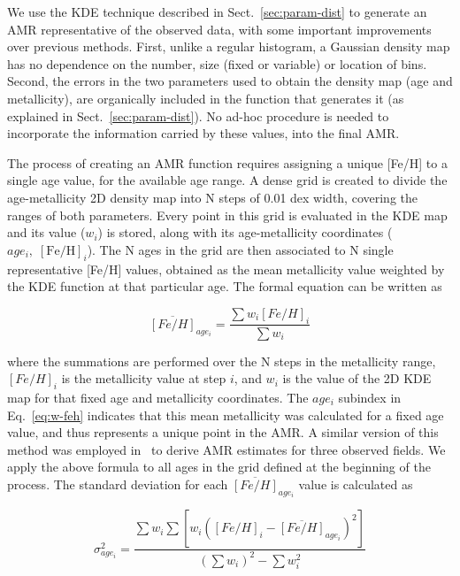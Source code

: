 \documentclass[referee]{aa}
\begin{document}
\begin{appendix}
We use the KDE technique described in Sect.~\ref{sec:param-dist} to
generate an AMR representative of the observed data, with some important
improvements over previous methods.
%
First, unlike a regular histogram, a Gaussian density map has no dependence on
the number, size (fixed or variable) or location of bins.
Second, the errors in the two parameters used to obtain the density map (age and
metallicity), are organically included in the function that generates it
(as explained in Sect.~\ref{sec:param-dist}). No ad-hoc procedure is needed to
incorporate the information carried by these values, into the final AMR.\@

The process of creating an AMR function
requires assigning a unique [Fe/H] to a single age value, for the available age
range.
%
A dense grid is created to divide the age-metallicity 2D density map into N
steps of 0.01 dex width, covering the ranges of both parameters. Every point in
this grid is evaluated in the KDE map and its value ($w_{i}$) is stored, along
with its age-metallicity coordinates ($age_{i},\;[\mathrm{Fe/H}]_{i}$).
%
The N ages in the grid are then associated to N single representative [Fe/H]
values, obtained as the mean metallicity value weighted by the KDE function at
that particular age. The formal equation can be written as

\begin{equation}
\overline{[Fe/H]}_{age_i}=\frac{\sum w_i {[Fe/H]}_i}{\sum w_i}
\label{eq:w-feh}
\end{equation}

\noindent where the summations are performed over the N steps in the metallicity
range, ${[Fe/H]}_i$ is the metallicity value at step $i$, and $w_i$ is the value
of the 2D KDE map for that fixed age and metallicity coordinates.
The $age_i$ subindex in Eq.~\ref{eq:w-feh} indicates that this mean
metallicity was calculated for a fixed age value, and thus represents a unique
point in the AMR.\@
A similar version of this method was employed  in~\citet[][see Eq. 3]{Noel_2009}
to derive AMR estimates for three observed fields.
We apply the above formula to all ages in the grid defined at the
beginning of the process. The standard deviation for each $\overline{[Fe/H]}_
{age_i}$ value is calculated as

\begin{equation}
\sigma_{age_i}^2=\frac{\sum w_i \sum [w_i {({[Fe/H]}_i -
\overline{[Fe/H]}_{age_i})}^2]}{{(\sum w_i)}^2 - \sum w_i^2}
\label{eq:w-std-dev}
\end{equation}


\end{appendix}
\end{document}
